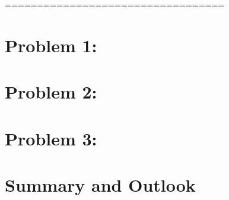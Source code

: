 ==================================
\section{Problem 1: }


\section{Problem 2: }


\section{Problem 3: }


\section{Summary and Outlook}

 \\


